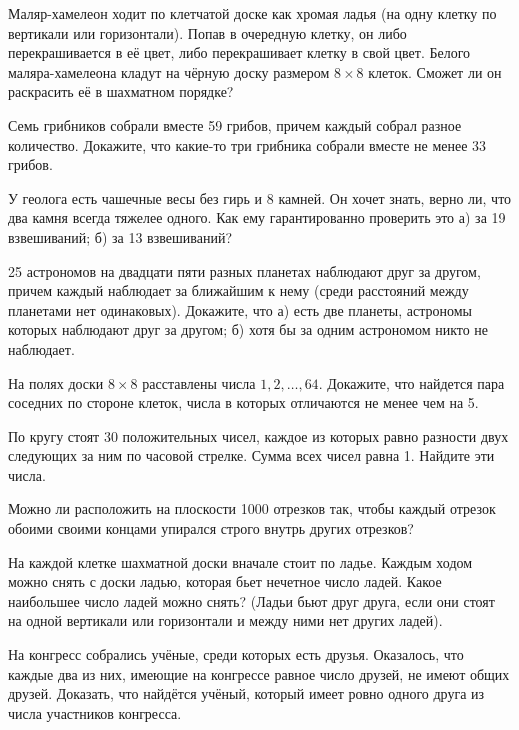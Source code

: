 \documentclass{article}
\begin{document}
\begin{enumerate_boxed}
        \item Маляр-хамелеон ходит по клетчатой доске как хромая ладья (на одну клетку по вертикали или горизонтали).
        Попав в очередную клетку, он либо перекрашивается в её цвет, либо перекрашивает клетку в свой цвет.
        Белого маляра-хамелеона кладут на чёрную доску размером $8 \times 8$ клеток.
        Сможет ли он раскрасить её в шахматном порядке?

        \item Семь грибников собрали вместе 59 грибов, причем каждый собрал разное количество.
        Докажите, что какие-то три грибника собрали вместе не менее 33 грибов.

        \item У геолога есть чашечные весы без гирь и 8 камней.
        Он хочет знать, верно ли, что два камня всегда тяжелее одного.
        Как ему гарантированно проверить это а) за 19 взвешиваний; б) за 13 взвешиваний?

        \item 25 астрономов на двадцати пяти разных планетах наблюдают друг за другом, причем каждый наблюдает за ближайшим к нему (среди расстояний между планетами нет одинаковых).
        Докажите, что а) есть две планеты, астрономы которых наблюдают друг за другом; б) хотя бы за одним астрономом никто не наблюдает.

        \item На полях доски $8 \times 8$ расставлены числа $1, 2, \dots, 64$.
        Докажите, что найдется пара соседних по стороне клеток, числа в которых отличаются не менее чем на 5.

        \item По кругу стоят 30 положительных чисел, каждое из которых равно разности двух следующих за ним по часовой стрелке.
        Сумма всех чисел равна 1.
        Найдите эти числа.

        \item Можно ли расположить на плоскости 1000 отрезков так, чтобы каждый отрезок обоими своими концами упирался строго внутрь других отрезков?

        \item На каждой клетке шахматной доски вначале стоит по ладье.
        Каждым ходом можно снять с доски ладью, которая бьет нечетное число ладей.
        Какое наибольшее число ладей можно снять?
        (Ладьи бьют друг друга, если они стоят на одной вертикали или горизонтали и между ними нет других ладей).

        \item На конгресс собрались учёные, среди которых есть друзья.
        Оказалось, что каждые два из них, имеющие на конгрессе равное число друзей, не имеют общих друзей.
        Доказать, что найдётся учёный, который имеет ровно одного друга из числа участников конгресса.


\end{enumerate_boxed}
\end{document}
